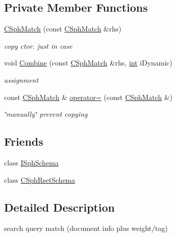 \subsection*{Private Member Functions}
\begin{DoxyCompactItemize}
\item 
\hyperlink{classCSphMatch_a581daa21d6116fa55af1ea9522924505}{C\-Sph\-Match} (const \hyperlink{classCSphMatch}{C\-Sph\-Match} \&rhs)
\begin{DoxyCompactList}\small\item\em copy ctor. just in case \end{DoxyCompactList}\item 
void \hyperlink{classCSphMatch_a27c0472a16a1e9ea6cc0b916ec3e1c1e}{Combine} (const \hyperlink{classCSphMatch}{C\-Sph\-Match} \&rhs, \hyperlink{sphinxexpr_8cpp_a4a26e8f9cb8b736e0c4cbf4d16de985e}{int} i\-Dynamic)
\begin{DoxyCompactList}\small\item\em assignment \end{DoxyCompactList}\item 
const \hyperlink{classCSphMatch}{C\-Sph\-Match} \& \hyperlink{classCSphMatch_a0089e30d750d3fe63dc768e4ac002ca2}{operator=} (const \hyperlink{classCSphMatch}{C\-Sph\-Match} \&)
\begin{DoxyCompactList}\small\item\em \char`\"{}manually\char`\"{} prevent copying \end{DoxyCompactList}\end{DoxyCompactItemize}
\subsection*{Friends}
\begin{DoxyCompactItemize}
\item 
class \hyperlink{classCSphMatch_a71032285b4b7b738d8cecf822e75835d}{I\-Sph\-Schema}
\item 
class \hyperlink{classCSphMatch_ae9fc32f1e11e9afd5d44b12b60e68c65}{C\-Sph\-Rset\-Schema}
\end{DoxyCompactItemize}


\subsection{Detailed Description}
search query match (document info plus weight/tag) 

